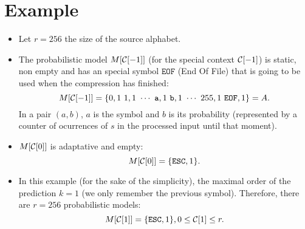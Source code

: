 \section*{Example}
\begin{itemize}
\item Let $r=256$ the size of the source alphabet.
\item The probabilistic model $M[{\cal C}[-1]]$ (for the special context
  ${\cal C}[-1]$) is static, non empty and has an special symbol $\mathtt{EOF}$
  (End Of File) that is going to be used when the compression has
  finished:
  $$M[{\cal C}[-1]]=\{0,1~1,1~\cdots~\mathtt{a},1~\mathtt{b},1~\cdots~255,1~\mathtt{EOF},1\}=A.$$
  In a pair $(a,b)$, $a$ is the symbol and $b$ is its probability (represented by a counter of ocurrences of $s$ in the processed input until that moment).

\item $M[{\cal C}[0]]$ is adaptative and empty:
  $$M[{\cal C}[0]]=\{\mathtt{ESC},1\}.$$

\item In this example (for the sake of the simplicity), the maximal
  order of the prediction $k=1$ (we only remember the previous
  symbol). Therefore, there are $r=256$ probabilistic models:
  $$M[{\cal C}[1]]=\{\mathtt{ESC},1\}, 0\le {\cal C}[1]\le r.$$


\end{itemize}
